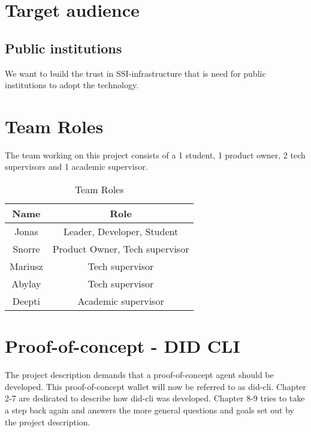 \section{Target audience}

\subsection{Public institutions}

We want to build the trust in SSI-infrastructure that is need for public institutions to adopt the technology.


\newpage

\section{Team Roles}

The team working on this project consists of a 1 student, 1 product owner, 2 tech supervisors and 1 academic supervisor.

\begin{table}
  \centering
  \caption{Team Roles}
  \label{tab:example1}
  \begin{tabular}{cc}
    \hline
    Name  & Role \\
    \hline
    Jonas       & Leader, Developer, Student         \\
    Snorre      & Product Owner, Tech supervisor \\
    Mariusz     & Tech supervisor \\
    Abylay      & Tech supervisor \\
    Deepti      & Academic supervisor \\
    \hline
  \end{tabular}
\end{table}



\newpage

\section{Proof-of-concept - DID CLI}

The project description demands that a proof-of-concept agent should be developed. This proof-of-concept wallet will now be referred to as \acrfull{did-cli}. Chapter 2-7 are dedicated to describe how \acrshort{did-cli} was developed. Chapter 8-9 tries to take a step back again and answers the more general questions and goals set out by the project description.

